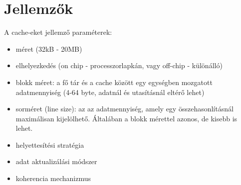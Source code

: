 \section{Jellemzők}
A cache-eket jellemző paraméterek:
\begin{itemize}
    \item méret (32kB - 20MB)
    \item elhelyezkedés (on chip - processzorlapkán, vagy off-chip - különálló)
    \item blokk méret: a fő tár és a cache között egy egységben mozgatott adatmennyiség (4-64 byte, adatnál és utasításnál eltérő lehet)
    \item sorméret (line size): az az adatmennyiség, amely egy összehasonlításnál maximálisan kijelölhető. Általában a blokk mérettel azonos, de kisebb is lehet.
    \item helyettesítési stratégia
    \item adat aktualizálási módszer
    \item koherencia mechanizmus
\end{itemize}